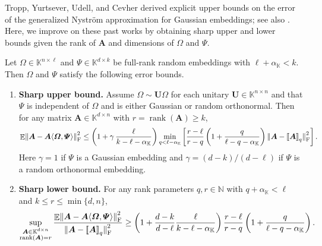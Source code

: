\documentclass[11pt]{article}
\newcommand{\field}{\mathbb{K}}
\DeclareMathOperator{\rank}{rank}
\newcommand{\mat}[1]{\boldsymbol{#1}}
\newcommand{\lowrank}[1]{%
  \mleft[\!\mleft[ #1 \mright]\!\mright]}
\newcommand{\norm}[1]{\mleft\| #1 \mright\|}
\DeclareMathOperator{\expect}{\mathbb{E}}
\theoremstyle{definition}
\numberwithin{equation}{section}
\begin{document}
Tropp, Yurtsever, Udell, and Cevher \cite[Thm.~4.3]{TYUC17} derived explicit upper bounds on the error of the generalized Nystr\"om approximation for Gaussian embeddings; see also \cite[Thm.~4.7]{CW09}.
Here, we improve on these past works by obtaining sharp upper and lower bounds given the rank of $\mat{A}$ and dimensions of $\mat{\varOmega}$ and $\mat{\varPsi}$.

\begin{theorem} \label{thm:gen_nystrom}
    Let $\mat{\varOmega} \in \field^{n \times \ell}$ and $\mat{\varPsi}\in\field^{d \times k}$ be full-rank random embeddings with $\ell + \alpha_{\field} < k$.
    Then $\mat{\varOmega}$ and $\mat{\varPsi}$ satisfy the following error bounds.
    \begin{enumerate}[label=(\alph*)]
        \item \textbf{Sharp upper bound.}
        Assume $\mat{\varOmega} \sim \mat{U}\mat{\varOmega}$ for each unitary $\mat{U}\in \field^{n \times n}$ and that $\mat{\varPsi}$ is independent of $\mat{\varOmega}$ and is either Gaussian or random orthonormal.
        Then for any matrix $\mat{A} \in \field^{d \times n}$ with $r = \rank(\mat{A}) \geq k$,
        \begin{equation*}
            \expect \norm{\mat{A} - \mat{A}\langle\mat{\varOmega},\mat{\varPsi}\rangle}_{\rm F}^2 
            \le \left(1 + \gamma \, \frac{\ell}{k - \ell - \alpha_\field} \right) 
            \min_{q < \ell - \alpha_\field} \left[\frac{r-\ell}{r-q} \left( 1 + \frac{q}{\ell-q-\alpha_\field} \right) 
            \norm{\smash{\mat{A} - \lowrank{\mat{A}}_q}}_{\rm F}^2\right].
        \end{equation*}
        Here $\gamma = 1$ if $\mat{\varPsi}$ is a Gaussian embedding and $\gamma = (d - k) / (d - \ell)$ if $\mat{\varPsi}$ is a random orthonormal embedding.
        \item \label{item:gen-nystrom-result-lower} \textbf{Sharp lower bound.} For any rank parameters $q, r \in \mathbb{N}$ with $q + \alpha_\field < \ell$ and $k \leq r \leq \min\{d,n\}$,
        \begin{equation*}
            \sup_{\substack{\mat{A} \in \field^{d\times n} \\ \rank(\mat{A}) = r}} 
            \frac{\expect \norm{\mat{A} - \mat{A}\langle\mat{\varOmega},\mat{\varPsi}\rangle}_{\rm F}^2}
            {\norm{\smash{\mat{A} - \lowrank{\mat{A}}_q}}_{\rm F}^2} 
            \ge \left(1 + \frac{d-k}{d-\ell} \frac{\ell}{k - \ell - \alpha_\field} \right)
            \frac{r-\ell}{r-q} \left( 1 + \frac{q}{\ell-q-\alpha_\field} \right).
        \end{equation*}
    \end{enumerate}
\end{theorem}
\end{document}
